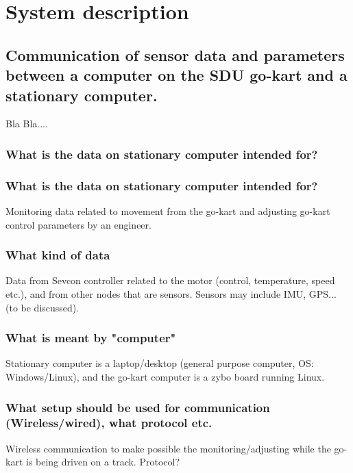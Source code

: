 
\section{System description}
\subsection{Communication of sensor data and parameters between a computer on the SDU go-kart and a stationary computer.}
Bla Bla....

\subsubsection{What is the data on stationary computer intended for?}
\subsubsection{What is the data on stationary computer intended for?}
Monitoring data related to movement from the go-kart and adjusting go-kart control parameters by an engineer.

\subsubsection{What kind of data}
Data from Sevcon controller related to the motor (control, temperature, speed etc.), and from other nodes that are sensors. Sensors may include IMU, GPS... (to be discussed).

\subsubsection{What is meant by "computer"}
Stationary computer is a laptop/desktop (general purpose computer, OS: Windows/Linux), and the go-kart computer is a zybo board running Linux.

\subsubsection{What setup should be used for communication (Wireless/wired), what protocol etc.}
Wireless communication to make possible the monitoring/adjusting while the go-kart is being driven on a track. Protocol?

\subsubsection{}

